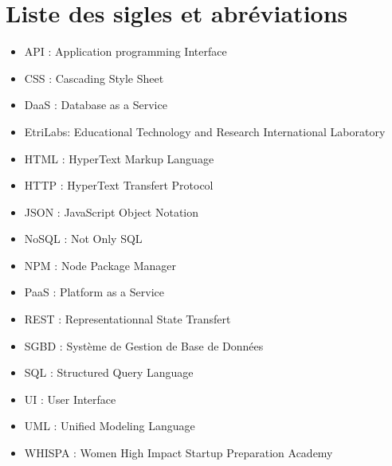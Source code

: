 \chapter{Liste des sigles et abréviations}
\begin{itemize}
\item[\textbullet] API : Application programming Interface
\item[\textbullet] CSS : Cascading Style Sheet
\item[\textbullet] DaaS : Database as a Service
\item[\textbullet] EtriLabs: Educational Technology and Research International Laboratory
\item[\textbullet] HTML : HyperText Markup Language
\item[\textbullet] HTTP : HyperText Transfert Protocol
\item[\textbullet] JSON : JavaScript Object Notation
\item[\textbullet] NoSQL : Not Only SQL
\item[\textbullet] NPM : Node Package Manager
\item[\textbullet] PaaS : Platform as a Service
\item[\textbullet] REST : Representationnal State Transfert
\item[\textbullet] SGBD : Système de Gestion de Base de Données
\item[\textbullet] SQL : Structured Query Language
\item[\textbullet] UI : User Interface
\item[\textbullet] UML : Unified Modeling Language
\item[\textbullet] WHISPA : Women High Impact Startup Preparation Academy
\end{itemize}